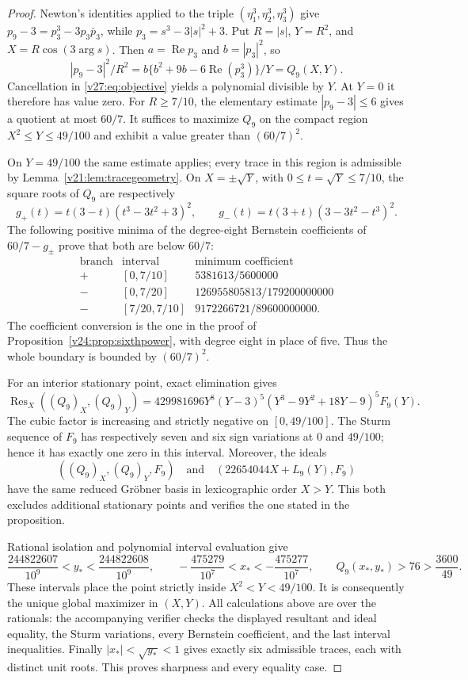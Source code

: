 \documentclass[UTF8,11pt]{ctexart}
\theoremstyle{definition}
\numberwithin{equation}{section}
\DeclareMathOperator{\Rea}{Re}\DeclareMathOperator{\Ima}{Im}
\begin{document}
\begin{proof}
Newton's identities applied to the triple $(\eta_1^3,\eta_2^3,\eta_3^3)$
give $p_9-3=p_3^3-3p_3\bar p_3$, while
$p_3=s^3-3|s|^2+3$. Put $R=|s|$, $Y=R^2$, and
$X=R\cos(3\arg s)$. Then $a=\Rea p_3$ and $b=|p_3|^2$,
so
\[
 |p_9-3|^2/R^2
 =b\{b^2+9b-6\Rea(p_3^3)\}/Y=Q_9(X,Y).
\]
Cancellation in \eqref{v27:eq:objective} yields a polynomial
divisible by $Y$. At $Y=0$ it therefore has value zero.
For $R\ge7/10$, the elementary estimate $|p_9-3|\le6$
gives a quotient at most $60/7$. It suffices to maximize $Q_9$
on the compact region $X^2\le Y\le49/100$ and exhibit a value
greater than $(60/7)^2$.

On $Y=49/100$ the same estimate applies; every trace in this
region is admissible by Lemma~\ref{v21:lem:tracegeometry}.
On $X=\pm\sqrt Y$, with $0\le t=\sqrt Y\le7/10$, the
square roots of $Q_9$ are respectively
\[
 g_+(t)=t(3-t)(t^3-3t^2+3)^2,\qquad
 g_-(t)=t(3+t)(3-3t^2-t^3)^2.
\]
The following positive minima of the degree-eight Bernstein
coefficients of $60/7-g_\pm$ prove that both are below $60/7$:
\[
\begin{array}{c|c|c}
 \text{branch}&\text{interval}&\text{minimum coefficient}\\ \hline
 +&[0,7/10]&5381613/5600000\\
 -&[0,7/20]&126955805813/179200000000\\
 -&[7/20,7/10]&9172266721/89600000000.
\end{array}
\]
The coefficient conversion is the one in the proof of
Proposition~\ref{v24:prop:sixthpower}, with degree eight in place
of five. Thus the whole boundary is bounded by $(60/7)^2$.

For an interior stationary point, exact elimination gives
\begin{equation}\label{v27:eq:resultant}
 \operatorname{Res}_X((Q_9)_X,(Q_9)_Y)
 =429981696Y^8(Y-3)^5
       (Y^3-9Y^2+18Y-9)^5F_9(Y).
\end{equation}
The cubic factor is increasing and strictly negative on
$[0,49/100]$. The Sturm sequence of $F_9$ has respectively
seven and six sign variations at $0$ and $49/100$; hence it
has exactly one zero in this interval. Moreover, the ideals
\[
 ((Q_9)_X,(Q_9)_Y,F_9)
 \quad\text{and}\quad
 (22654044X+L_9(Y),F_9)
\]
have the same reduced Gr\"obner basis in lexicographic order
$X>Y$. This both excludes additional stationary points and
verifies the one stated in the proposition.

Rational isolation and polynomial interval evaluation give
\[
 \frac{244822607}{10^9}<y_*<\frac{244822608}{10^9},\qquad
 -\frac{475279}{10^7}<x_*<-\frac{475277}{10^7},\qquad
 Q_9(x_*,y_*)>76>\frac{3600}{49}.
\]
These intervals place the point strictly inside $X^2<Y<49/100$.
It is consequently the unique global maximizer in $(X,Y)$.
All calculations above are over the rationals: the accompanying
verifier checks the displayed resultant and ideal equality,
the Sturm variations, every Bernstein coefficient, and the
last interval inequalities. Finally $|x_*|<\sqrt{y_*}<1$
gives exactly six admissible traces, each with distinct unit
roots. This proves sharpness and every equality case.
\end{proof}
\end{document}
